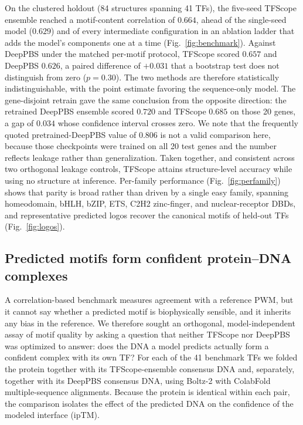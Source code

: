 \documentclass[11pt]{article}
\begin{document}
On the clustered holdout (84 structures spanning 41 TFs), the five-seed TFScope
ensemble reached a motif-content correlation of $\mathbf{0.664}$, ahead of the
single-seed model ($0.629$) and of every intermediate configuration in an ablation
ladder that adds the model's components one at a time (Fig.~\ref{fig:benchmark}).
Against DeepPBS under the matched per-motif protocol, TFScope scored $0.657$ and
DeepPBS $0.626$, a paired difference of $+0.031$ that a bootstrap test does not
distinguish from zero ($p=0.30$). The two methods are therefore statistically
indistinguishable, with the point estimate favoring the sequence-only model. The
gene-disjoint retrain gave the same conclusion from the opposite direction: the
retrained DeepPBS ensemble scored $0.720$ and TFScope $0.685$ on those 20 genes, a
gap of $0.034$ whose confidence interval crosses zero. We note that the frequently
quoted pretrained-DeepPBS value of $0.806$ is not a valid comparison here, because
those checkpoints were trained on all 20 test genes and the number reflects leakage
rather than generalization. Taken together, and consistent across two orthogonal
leakage controls, TFScope attains structure-level accuracy while using no structure
at inference. Per-family performance (Fig.~\ref{fig:perfamily}) shows that parity is
broad rather than driven by a single easy family, spanning homeodomain, bHLH, bZIP,
ETS, C2H2 zinc-finger, and nuclear-receptor DBDs, and representative predicted logos
recover the canonical motifs of held-out TFs (Fig.~\ref{fig:logos}).

\subsection*{Predicted motifs form confident protein--DNA complexes}

A correlation-based benchmark measures agreement with a reference PWM, but it cannot
say whether a predicted motif is biophysically sensible, and it inherits any bias in
the reference. We therefore sought an orthogonal, model-independent assay of motif
quality by asking a question that neither TFScope nor DeepPBS was optimized to
answer: does the DNA a model predicts actually form a confident complex with its own
TF? For each of the 41 benchmark TFs we folded the protein together with its
TFScope-ensemble consensus DNA and, separately, together with its DeepPBS consensus
DNA, using Boltz-2\cite{passaro2025boltz2,wohlwend2024boltz1} with ColabFold multiple-sequence
alignments\cite{mirdita2022colabfold}. Because the protein is identical within each
pair, the comparison isolates the effect of the predicted DNA on the confidence of
the modeled interface (ipTM).
\end{document}
